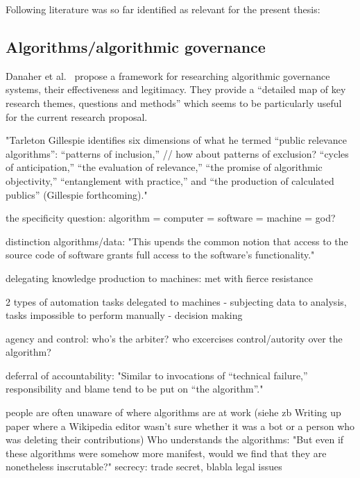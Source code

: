 \documentclass[pdftex,a4paper,11pt]{scrartcl}
\begin{document}
Following literature was so far identified as relevant for the present thesis:

\subsection{Algorithms/algorithmic governance}

\cite{DanaherEtAl2017}
Danaher et al.~\cite{DanaherEtAl2017} propose a framework for researching algorithmic governance systems, their effectiveness and legitimacy.
They provide a ``detailed map of key research themes, questions and methods'' which seems to be particularly useful for the current research proposal.

\cite{BarHooZie2013}
"Tarleton Gillespie identifies six dimensions of what he
termed “public relevance algorithms”:
“patterns of inclusion,” // how about patterns of exclusion?
“cycles of anticipation,”
“the evaluation of relevance,” 
“the promise of algorithmic objectivity,”
“entanglement with practice,”
and “the production of calculated publics” (Gillespie forthcoming)."

the specificity question:
algorithm = computer = software = machine = god?

distinction algorithms/data:
"This upends the common notion that access to the source code of
software grants full access to the software’s functionality."

delegating knowledge production to machines: met with fierce resistance

2 types of automation tasks delegated to machines
- subjecting data to analysis, tasks impossible to perform manually
- decision making

agency and control: who's the arbiter? who excercises control/autority over the
algorithm?

deferral of accountability:
"Similar to invocations of
“technical failure,” responsibility and blame tend to be put on “the
algorithm”."

people are often unaware of where algorithms are at work (siehe zb Writing up
paper where a Wikipedia editor wasn't sure whether it was a bot or a person who
was deleting their contributions)
Who understands the algorithms:
"But even if these algorithms
were somehow more manifest, would we find that they are nonetheless
inscrutable?"
secrecy: trade secret, blabla
legal issues
\end{document}
